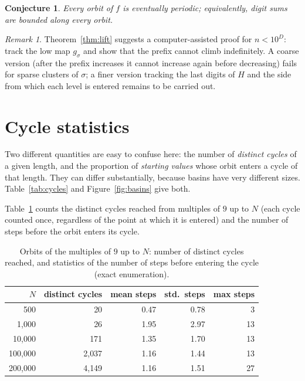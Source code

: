 \documentclass[11pt]{article}
\newtheorem{conjecture}[theorem]{Conjecture}
\theoremstyle{definition}
\theoremstyle{remark}
\newtheorem{remark}[theorem]{Remark}
\begin{document}
\begin{conjecture}\label{conj:conv}
Every orbit of $f$ is eventually periodic; equivalently, digit sums are
bounded along every orbit.
\end{conjecture}

\begin{remark}
Theorem~\ref{thm:lift} suggests a computer-assisted proof for $n<10^D$: track
the low map $g_\sigma$ and show that the prefix cannot climb indefinitely. A
coarse version (after the prefix increases it cannot increase again before
decreasing) fails for sparse clusters of $\sigma$; a finer version tracking the
last digits of $H$ and the side from which each level is entered remains to
be carried out.
\end{remark}

\section{Cycle statistics}

Two different quantities are easy to confuse here: the number of
\emph{distinct cycles} of a given length, and the proportion of
\emph{starting values} whose orbit enters a cycle of that length. They can
differ substantially, because basins have very different sizes.
Table~\ref{tab:cycles} and Figure~\ref{fig:basins} give both.

Table~\ref{tab:corrected} counts the distinct cycles reached from multiples
of $9$ up to $N$ (each cycle counted once, regardless of the point at which it
is entered) and the number of steps before the orbit enters its cycle.

\begin{table}[h]
\centering
\begin{tabular}{rrrrr}
\toprule
$N$ & distinct cycles & mean steps & std.\ steps & max steps\\
\midrule
500 & 20 & 0.47 & 0.78 & 3\\
1{,}000 & 26 & 1.95 & 2.97 & 13\\
10{,}000 & 171 & 1.35 & 1.70 & 13\\
100{,}000 & 2{,}037 & 1.16 & 1.44 & 13\\
200{,}000 & 4{,}149 & 1.16 & 1.51 & 27\\
\bottomrule
\end{tabular}
\caption{Orbits of the multiples of $9$ up to $N$: number of distinct cycles
reached, and statistics of the number of steps before entering the cycle
(exact enumeration).}\label{tab:corrected}
\end{table}
\end{document}
